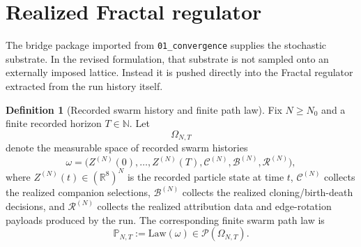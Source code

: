 \documentclass[11pt]{article}
\theoremstyle{definition}
\newtheorem{definition}[theorem]{Definition}
\theoremstyle{remark}
\newcommand{\R}{\mathbb R}
\newcommand{\N}{\mathbb N}
\newcommand{\Law}{\mathrm{Law}}
\newcommand{\mcC}{\mathcal C}
\newcommand{\mcP}{\mathcal P}
\newcommand{\mcB}{\mathcal B}
\newcommand{\mcR}{\mathcal R}
\begin{document}
\section{Realized Fractal regulator}

The bridge package imported from \texttt{01\_convergence} supplies the
stochastic substrate. In the revised formulation, that substrate is not sampled
onto an externally imposed lattice. Instead it is pushed directly into the
Fractal regulator extracted from the run history itself.

\begin{definition}[Recorded swarm history and finite path law]
\label{def:history-path-law}
Fix \(N\ge N_0\) and a finite recorded horizon \(T\in\N\). Let
\[
\Omega_{N,T}
\]
denote the measurable space of recorded swarm histories
\[
\omega=
\bigl(
Z^{(N)}(0),\dots,Z^{(N)}(T),
\mcC^{(N)},\mcB^{(N)},\mcR^{(N)}
\bigr),
\]
where \(Z^{(N)}(t)\in(\R^8)^N\) is the recorded particle state at time \(t\),
\(\mcC^{(N)}\) collects the realized companion selections, \(\mcB^{(N)}\)
collects the realized cloning/birth-death decisions, and \(\mcR^{(N)}\)
collects the realized attribution data and edge-rotation payloads produced by
the run. The corresponding finite swarm path law is
\[
\mathbb P_{N,T}:=\Law(\omega)\in\mcP(\Omega_{N,T}).
\]
\end{definition}
\end{document}
